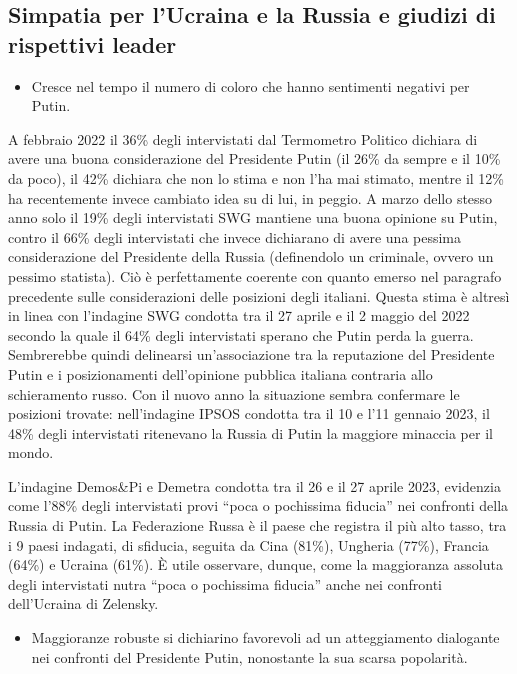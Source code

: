 \documentclass[
  openany]{book}
\providecommand{\tightlist}{%
  \setlength{\itemsep}{0pt}\setlength{\parskip}{0pt}}
\begin{document}
\hypertarget{simpatia-per-lucraina-e-la-russia-e-giudizi-di-rispettivi-leader}{%
\subsection{Simpatia per l'Ucraina e la Russia e giudizi di rispettivi leader}\label{simpatia-per-lucraina-e-la-russia-e-giudizi-di-rispettivi-leader}}

\begin{itemize}
\tightlist
\item
  Cresce nel tempo il numero di coloro che hanno sentimenti negativi per Putin.
\end{itemize}

A febbraio 2022 il 36\% degli intervistati dal Termometro Politico dichiara di avere una buona considerazione del Presidente Putin (il 26\% da sempre e il 10\% da poco), il 42\% dichiara che non lo stima e non l'ha mai stimato, mentre il 12\% ha recentemente invece cambiato idea su di lui, in peggio. A marzo dello stesso anno solo il 19\% degli intervistati SWG mantiene una buona opinione su Putin, contro il 66\% degli intervistati che invece dichiarano di avere una pessima considerazione del Presidente della Russia (definendolo un criminale, ovvero un pessimo statista). Ciò è perfettamente coerente con quanto emerso nel paragrafo precedente sulle considerazioni delle posizioni degli italiani. Questa stima è altresì in linea con l'indagine SWG condotta tra il 27 aprile e il 2 maggio del 2022 secondo la quale il 64\% degli intervistati sperano che Putin perda la guerra. Sembrerebbe quindi delinearsi un'associazione tra la reputazione del Presidente Putin e i posizionamenti dell'opinione pubblica italiana contraria allo schieramento russo. Con il nuovo anno la situazione sembra confermare le posizioni trovate: nell'indagine IPSOS condotta tra il 10 e l'11 gennaio 2023, il 48\% degli intervistati ritenevano la Russia di Putin la maggiore minaccia per il mondo.

L'indagine Demos\&Pi e Demetra condotta tra il 26 e il 27 aprile 2023, evidenzia come l'88\% degli intervistati provi ``poca o pochissima fiducia'' nei confronti della Russia di Putin. La Federazione Russa è il paese che registra il più alto tasso, tra i 9 paesi indagati, di sfiducia, seguita da Cina (81\%), Ungheria (77\%), Francia (64\%) e Ucraina (61\%). È utile osservare, dunque, come la maggioranza assoluta degli intervistati nutra ``poca o pochissima fiducia'' anche nei confronti dell'Ucraina di Zelensky.

\begin{itemize}
\tightlist
\item
  Maggioranze robuste si dichiarino favorevoli ad un atteggiamento dialogante nei confronti del Presidente Putin, nonostante la sua scarsa popolarità.
\end{itemize}
\end{document}
